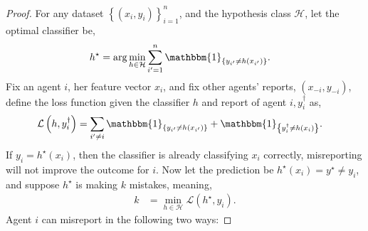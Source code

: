 \documentclass{article}
\begin{document}
\begin{proof} \label{proof:zologpf} 
For any dataset $\left\{\left(x_{i}, y_{i}\right)\right\}_{i=1}^{n}$, and the hypothesis class $\mathcal{H}$, let the optimal classifier be,
\begin{align*}
h^\star  &= \arg\displaystyle\min_{h \in \mathcal{H}} \displaystyle\sum_{i'=1}^{n} \mathbbm{1}_{\left\{y_{i'} \neq  h\left(x_{i'}\right)\right\}}.
\end{align*}
Fix an agent $i $, her feature vector $x_{i}$, and fix other agents' reports, $\left(x_{-i}, y_{-i}\right)$, define the loss function given the classifier $h $ and report of agent $i , y^{\dagger}_{i}$ as,
\begin{align*}
\mathcal{L}\left(h, y^{\dagger}_{i}\right) &= \displaystyle\sum_{i' \neq  i} \mathbbm{1}_{\left\{y_{i'} \neq  h\left(x_{i'}\right)\right\}} + \mathbbm{1}_{\left\{y^{\dagger}_{i} \neq  h\left(x_{i}\right)\right\}}.
\end{align*}
If $y_{i} = h^\star \left(x_{i}\right)$, then the classifier is already classifying $x_{i}$ correctly, misreporting will not improve the outcome for $i $. Now let the prediction be $h^\star \left(x_{i}\right) = y^\star  \neq  y_{i}$, and suppose $h^\star $ is making $k $ mistakes, meaning,
\begin{align*}
k  &= \displaystyle\min_{h \in \mathcal{H}} \mathcal{L}\left(h^\star , y_{i}\right).
\end{align*}
Agent $i $ can misreport in the following two ways:
\end{proof}
\end{document}

